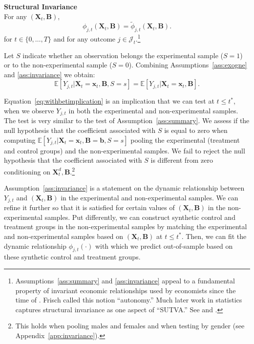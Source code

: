 \onehalfspacing
\begin{assumption}\label{ass:invariance} \textbf{Structural Invariance} \\
\noindent For any  $\left( \bm{X}_{t}, \bm{B} \right)$,
\begin{equation}
\phi_{j,t} \left( \bm{X}_{t}, \bm{B} \right) = \widetilde{\phi}_{j,t} \left( \bm{X}_{t}, \bm{B} \right).
\end{equation}
for $t \in \{ 0, \ldots, T \}$ and for any outcome $j \in \mathcal{J}_{t}$.\footnote{Assumptions~\ref{ass:summary} and \ref{ass:invariance} appeal to a fundamental property of invariant economic relationships used by economists since the time of \citet{Frisch_1938_autonomy}. Frisch called this notion ``autonomy.'' Much later work in statistics captures structural invariance as one aspect of ``SUTVA.'' See \citet{Holland_1986_JASA} and \citet{Heckman_2008_ISR}.}
\end{assumption}
\doublespacing

Let $S$ indicate whether an observation belongs the experimental sample ($S = 1$) or to the non-experimental sample ($S = 0$). Combining Assumptions~\ref{ass:exogne} and \ref{ass:invariance} we obtain:
\begin{equation}\label{eq:withbetimplication}
\mathbb{E} \left[ Y_{j,t} | \bm{X}_{t} = \bm{x}_{t}, \bm{B}, S = s \right] = \mathbb{E} \left[ Y_{j,t} | \bm{X}_{t} = \bm{x}_{t}, \bm{B} \right].
\end{equation}

Equation~\eqref{eq:withbetimplication} is an implication that we can test at $t \leq t^*$, when we observe $Y_{j,t}$ in both the experimental and non-experimental samples. The test is very similar to the test of Assumption~\ref{ass:summary}. We assess if the null hypothesis that the coefficient associated with $S$ is equal to zero when computing $\mathbb{E} \left[ Y_{j,t} | \bm{X}_{t} = \bm{x}_{t}, \bm{B} = \bm{b}, S = s \right]$ pooling the experimental (treatment and control groups) and the non-experimental samples. We fail to reject the null hypothesis that the coefficient associated with $S$ is different from zero conditioning on $\bm{X}_{t}^d, \bm{B}$.\footnote{This holds when pooling males and females and when testing by gender (see Appendix~\ref{app:invariance}).}

Assumption~\ref{ass:invariance} is a statement on the dynamic relationship between $Y_{j,t}$ and $\left( \bm{X}_{t}, \bm{B} \right)$ in the experimental and non-experimental samples. We can refine it further so that it is satisfied for certain values of $\left( \bm{X}_{t}, \bm{B} \right)$ in the non-experimental samples. Put differently, we can construct synthetic control and treatment groups in the non-experimental samples by matching the experimental and non-experimental samples based on $\left( \bm{X}_{t}, \bm{B} \right)$ at $t \leq t^*$. Then, we can fit the dynamic relationship $\phi_{j,t} \left( \cdot \right)$ with which we predict out-of-sample based on these synthetic control and treatment groups.

